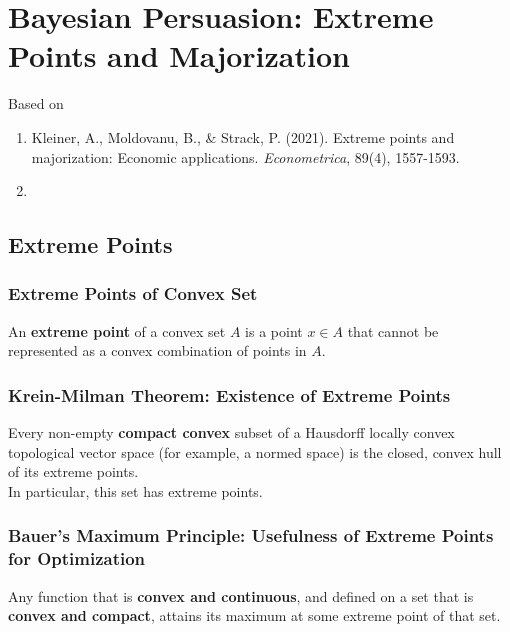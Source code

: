 \documentclass[11pt]{elegantbook}
\begin{document}
\chapter{Bayesian Persuasion: Extreme Points and Majorization}
Based on
\begin{enumerate}[$\circ$]
    \item Kleiner, A., Moldovanu, B., \& Strack, P. (2021). Extreme points and majorization: Economic applications. \textit{Econometrica}, 89(4), 1557-1593.
    \item 
\end{enumerate}


\section{Extreme Points}
\subsection{Extreme Points of Convex Set}
\begin{definition}
    \normalfont
    An \textbf{extreme point} of a convex set $A$ is a point $x\in A$ that cannot be represented as a convex combination of points in $A$.
\end{definition}

\subsection{Krein-Milman Theorem: Existence of Extreme Points}
\begin{theorem}\label{KMT}
    Every non-empty \textbf{compact convex} subset of a Hausdorff locally convex topological vector space (for example, a normed space) is the closed, convex hull of its extreme points.\\
    In particular, this set has extreme points.
\end{theorem}


\subsection{Bauer's Maximum Principle: Usefulness of Extreme Points for Optimization}
\begin{theorem}\label{BMP}
    Any function that is \textbf{convex and continuous}, and defined on a set that is \textbf{convex and compact}, attains its maximum at some extreme point of that set.
\end{theorem}
\end{document}
